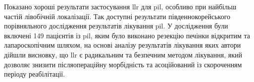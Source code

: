 Показано хороші результати застосування \acrshort{llr} для \acrshort{pil}, особливо при найбільш частій лівобічній локалізації. Так доступні результати південнокорейського порівняльного дослідження результатів лікування \acrshort{pil}. У дослідження були включені 149 пацієнтів із \acrshort{pil}, яким було виконано резекцію печінки відкритим та лапароскопічним шляхом, на основі аналізу результатів лікування яких автори дійшли висновку, що \acrshort{llr} є радикальним та безпечним методом лікування, який дозволяє знизити післяопераційну морбідність та асоційований із скороченням періоду реабілітації.